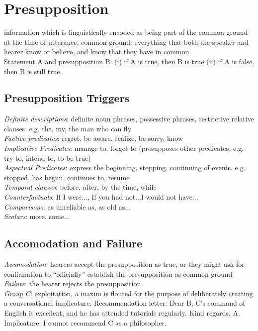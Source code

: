 \section{Presupposition}
information which is linguistically encoded as being part of the common ground at the time of utterance. {\tiny common ground: everything that both the speaker and hearer know or believe, and know that they have in common.}\\
Statement A and presupposition B: (i) if A is true, then B is true (ii) if A is false, then B is still true.\\
\subsection*{Presupposition Triggers}
\emph{Definite descriptions}: definite noun phrases, possessive phrases, restrictive relative clauses. e.g. the, my, the man who can fly\\
\emph{Factive predicates}: regret, be aware, realize, be sorry, know\\
\emph{Implicative Predicates}: manage to, forget to (presupposes other predicates, e.g. try to, intend to, to be true)\\
\emph{Aspectual Predicates}: express the beginning, stopping, continuing of events. e.g. stopped, has begun, continues to, resume\\
\emph{Temporal clauses}: before, after, by the time, while\\
\emph{Counterfactuals}: If I were..., If you had not...I would not have...\\
\emph{Comparisons}: as unreliable as, as old as...\\
\emph{Scalars}: more, some...\\
\subsection*{Accomodation and Failure}
\emph{Accomodation}: hearers accept the presupposition as true, or they might ask for confirmation to “officially” establish the presupposition as common ground\\
\emph{Failure}: the hearer rejects the presupposition\\
\emph{Group C}: exploitation, a maxim is flouted for the purpose of deliberately creating a conversational implicature. {\tiny Recommendation letter: Dear B, C’s command of English is excellent, and he has attended tutorials regularly. Kind regards, A. Implicature: I cannot recommend C as a philosopher.}\\